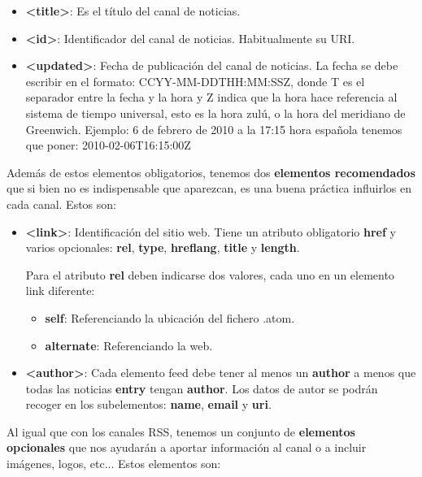 \begin{enumerate}
    \begin{itemize}
        \item \textbf{<title>}: Es el título del canal de noticias.
        \item \textbf{<id>}: Identificador del canal de noticias. Habitualmente su URI.
        \item \textbf{<updated>}: Fecha de publicación del canal de noticias. La fecha se debe escribir en el formato: CCYY-MM-DDTHH:MM:SSZ, donde T es el separador entre la fecha y la hora y Z indica que la hora hace referencia al sistema de tiempo universal, esto es la hora zulú, o la hora del meridiano de Greenwich. Ejemplo: 6 de febrero de 2010 a la 17:15 hora española tenemos que poner: 2010-02-06T16:15:00Z
    \end{itemize}

    Además de estos elementos obligatorios, tenemos dos \textbf{elementos recomendados} que si bien no es indispensable que aparezcan, es una buena práctica influirlos en cada canal. Estos son:

    \begin{itemize}
        \item \textbf{<link>}: Identificación del sitio web. Tiene un atributo obligatorio \textbf{href} y varios opcionales: \textbf{rel}, \textbf{type}, \textbf{hreflang}, \textbf{title} y \textbf{length}.

        Para el atributo \textbf{rel} deben indicarse dos valores, cada uno en un elemento link diferente:
        \begin{itemize}
            \item \textbf{self}: Referenciando la ubicación del fichero .atom.
            \item \textbf{alternate}: Referenciando la web.
        \end{itemize}

        \item \textbf{<author>}: Cada elemento feed debe tener al menos un \textbf{author} a menos que todas las noticias \textbf{entry} tengan \textbf{author}. Los datos de autor se podrán recoger en los subelementos: \textbf{name}, \textbf{email} y \textbf{uri}.
    \end{itemize}

    Al igual que con los canales RSS, tenemos un conjunto de \textbf{elementos opcionales} que nos ayudarán a aportar información al canal o a incluir imágenes, logos, etc... Estos elementos son:


\end{enumerate}
